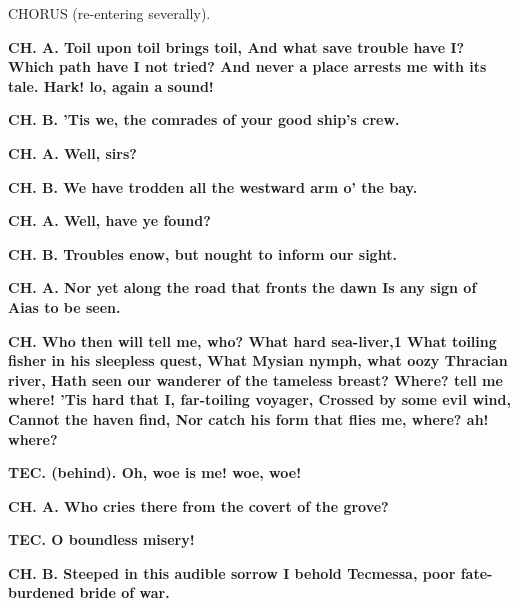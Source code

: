 \documentclass[11pt,letter]{book}
\begin{document}
\par  CHORUS (re-entering severally).

\par \textbf{CH. A. Toil upon toil brings toil, And what save trouble have I? Which path have I not tried? And never a place arrests me with its tale. Hark! lo, again a sound!}
\par 

\par \textbf{CH. B. ’Tis we, the comrades of your good ship’s crew.}
\par 

\par \textbf{CH. A. Well, sirs?}
\par 

\par \textbf{CH. B. We have trodden all the westward arm o’ the bay.}
\par 

\par \textbf{CH. A. Well, have ye found?}
\par 

\par \textbf{CH. B. Troubles enow, but nought to inform our sight.}
\par 

\par \textbf{CH. A. Nor yet along the road that fronts the dawn Is any sign of Aias to be seen.}
\par 

\par \textbf{CH. Who then will tell me, who? What hard sea-liver,1 What toiling fisher in his sleepless quest, What Mysian nymph, what oozy Thracian river, Hath seen our wanderer of the tameless breast? Where? tell me where! ’Tis hard that I, far-toiling voyager, Crossed by some evil wind, Cannot the haven find, Nor catch his form that flies me, where? ah! where?}
\par 

\par \textbf{TEC. (behind). Oh, woe is me! woe, woe!}
\par 

\par \textbf{CH. A. Who cries there from the covert of the grove?}
\par 

\par \textbf{TEC. O boundless misery!}
\par 

\par \textbf{CH. B. Steeped in this audible sorrow I behold Tecmessa, poor fate-burdened bride of war.}
\par 
\end{document}
